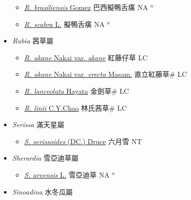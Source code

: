 \begin{itemize}
  \begin{itemize}
        \item[] \href{http://www.theplantlist.org/tpl1.1/search?q=Richardia+brasiliensis}{\textit{R. brasiliensis} Gomez}   巴西擬鴨舌癀 NA $^n$
        \item[] \href{http://www.theplantlist.org/tpl1.1/search?q=Richardia+scabra}{\textit{R. scabra} L.}   擬鴨舌癀 NA $^n$
  \end{itemize}
 \item[] \textit{Rubia} 茜草屬
                    
  \begin{itemize}
        \item[] \href{http://www.theplantlist.org/tpl1.1/search?q=Rubia+akane+var.+akane}{\textit{R. akane} Nakai var. \textit{akane}}   紅藤仔草 LC
        \item[] \href{http://www.theplantlist.org/tpl1.1/search?q=Rubia+akane+var.+erecta}{\textit{R. akane} Nakai var. \textit{erecta} Masam.}   直立紅藤草\# LC
        \item[] \href{http://www.theplantlist.org/tpl1.1/search?q=Rubia+lanceolata}{\textit{R. lanceolata} Hayata}   金劍草\# LC
        \item[] \href{http://www.theplantlist.org/tpl1.1/search?q=Rubia+linii}{\textit{R. linii} C.Y.Chao}   林氏茜草\# LC
  \end{itemize}
 \item[] \textit{Serissa} 滿天星屬
                    
  \begin{itemize}
        \item[] \href{http://www.theplantlist.org/tpl1.1/search?q=Serissa+serissoides}{\textit{S. serissoides} (DC.) Druce}   六月雪 NT
  \end{itemize}
 \item[] \textit{Sherardia} 雪亞迪草屬
                    
  \begin{itemize}
        \item[] \href{http://www.theplantlist.org/tpl1.1/search?q=Sherardia+arvensis}{\textit{S. arvensis} L.}   雪亞迪草 NA $^n$
  \end{itemize}
 \item[] \textit{Sinoadina} 水冬瓜屬
                    

\end{itemize}
